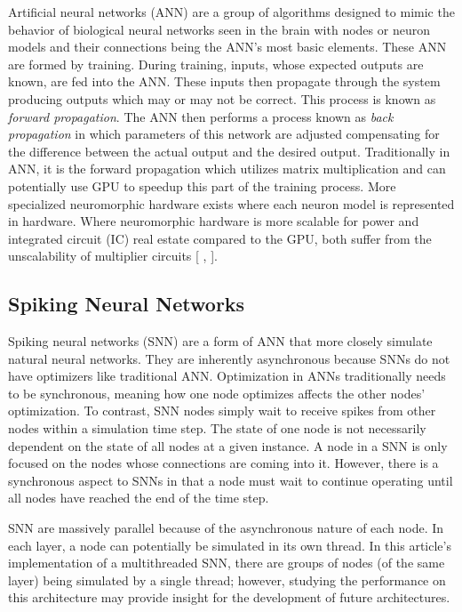 \documentclass[journal]{IEEEtran}
\begin{document}
Artificial neural networks (ANN) are a group of algorithms designed to mimic the behavior of biological neural networks seen in the brain with nodes or neuron models and their connections being the ANN's most basic elements. These ANN are formed by training. During training, inputs, whose expected outputs are known, are fed into the ANN. These inputs then propagate through the system producing outputs which may or may not be correct. This process is known as \emph{forward propagation}. The ANN then performs a process known as \emph{back propagation} in which parameters of this network are adjusted compensating for the difference between the actual output and the desired output. Traditionally in ANN, it is the forward propagation which utilizes matrix multiplication and can potentially use GPU to speedup this part of the training process. More specialized neuromorphic hardware exists where each neuron model is represented in hardware. Where neuromorphic hardware is more scalable for power and integrated circuit (IC) real estate compared to the GPU, both suffer from the unscalability of multiplier circuits [ , ].

\subsection{Spiking Neural Networks}

Spiking neural networks (SNN) are a form of ANN that more closely simulate natural neural networks. They are inherently asynchronous because SNNs do not have optimizers like traditional ANN. Optimization in ANNs traditionally needs to be synchronous, meaning how one node optimizes affects the other nodes' optimization. To contrast, SNN nodes simply wait to receive spikes from other nodes within a simulation time step. The state of one node is not necessarily dependent on the state of all nodes at a given instance. A node in a SNN is only focused on the nodes whose connections are coming into it. However, there is a synchronous aspect to SNNs in that a node must wait to continue operating until all nodes have reached the end of the time step\cite{Bouvier2019}.

\par

SNN are massively parallel because of the asynchronous nature of each node. In each layer, a node can potentially be simulated in its own thread. In this article's implementation of a multithreaded SNN, there are groups of nodes (of the same layer) being simulated by a single thread; however, studying the performance on this architecture may provide insight for the development of future architectures. 
\end{document}

